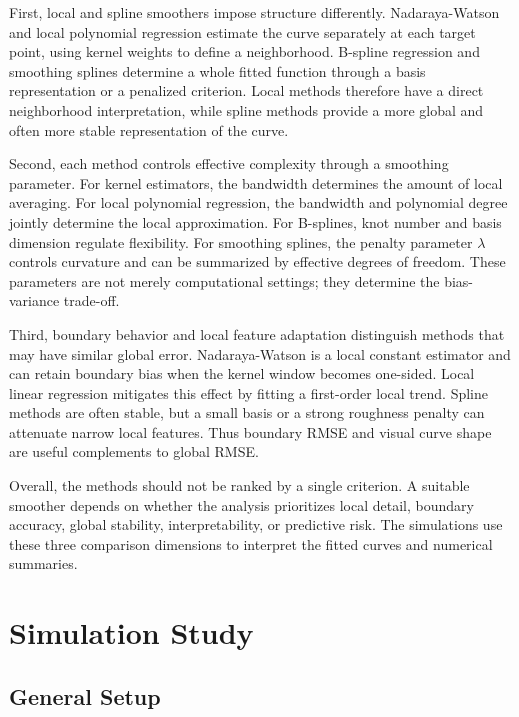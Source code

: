\documentclass[12pt,a4paper]{article}
\newcommand{\FloatBarrier}{\par}
\begin{document}
First, local and spline smoothers impose structure differently. Nadaraya-Watson and local polynomial regression estimate the curve separately at each target point, using kernel weights to define a neighborhood. B-spline regression and smoothing splines determine a whole fitted function through a basis representation or a penalized criterion. Local methods therefore have a direct neighborhood interpretation, while spline methods provide a more global and often more stable representation of the curve.

Second, each method controls effective complexity through a smoothing parameter. For kernel estimators, the bandwidth determines the amount of local averaging. For local polynomial regression, the bandwidth and polynomial degree jointly determine the local approximation. For B-splines, knot number and basis dimension regulate flexibility. For smoothing splines, the penalty parameter \(\lambda\) controls curvature and can be summarized by effective degrees of freedom. These parameters are not merely computational settings; they determine the bias-variance trade-off.

Third, boundary behavior and local feature adaptation distinguish methods that may have similar global error. Nadaraya-Watson is a local constant estimator and can retain boundary bias when the kernel window becomes one-sided. Local linear regression mitigates this effect by fitting a first-order local trend. Spline methods are often stable, but a small basis or a strong roughness penalty can attenuate narrow local features. Thus boundary RMSE and visual curve shape are useful complements to global RMSE.

Overall, the methods should not be ranked by a single criterion. A suitable smoother depends on whether the analysis prioritizes local detail, boundary accuracy, global stability, interpretability, or predictive risk. The simulations use these three comparison dimensions to interpret the fitted curves and numerical summaries.

\FloatBarrier

\section{Simulation Study}
\label{sec:simulation}

\subsection{General Setup}
\end{document}

